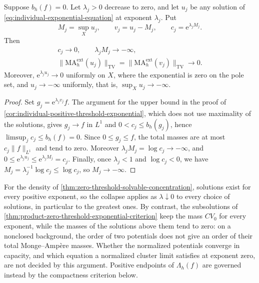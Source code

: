 \begin{proposition}\label{prop:zero-threshold-exponential-mass-collapse}
Suppose $b_h(f)=0$. Let $\lambda_j>0$ decrease to zero, and let $u_j$ be any solution of \eqref{eq:individual-exponential-equation} at exponent $\lambda_j$. Put
\[
 M_j=\sup_Xu_j,\qquad v_j=u_j-M_j,\qquad
 c_j=\mathrm e^{\lambda_jM_j}.
\]
Then
\begin{gather*}
 c_j\longrightarrow0,\qquad \lambda_jM_j\longrightarrow-\infty,\\
 \|\mathrm{MA}^{\mathrm{ext}}_h(u_j)\|_{\mathrm{TV}}
 =\|\mathrm{MA}^{\mathrm{ext}}_h(v_j)\|_{\mathrm{TV}}
 \longrightarrow0.
\end{gather*}
Moreover, $\mathrm e^{\lambda_ju_j}\to0$ uniformly on $X$, where the exponential is zero on the pole set, and $u_j\to-\infty$ uniformly, that is, $\sup_Xu_j\to-\infty$.
\end{proposition}
\begin{proof}
Set $g_j=\mathrm e^{\lambda_jv_j}f$. The argument for the upper bound in the proof of \cref{cor:individual-positive-threshold-exponential}, which does not use maximality of the solutions, gives $g_j\to f$ in $L^1$ and $0<c_j\leq b_h(g_j)$, hence $\limsup_jc_j\leq b_h(f)=0$. Since $0\leq g_j\leq f$, the total masses are at most $c_j\|f\|_{L^1}$ and tend to zero. Moreover $\lambda_jM_j=\log c_j\to-\infty$, and $0\leq\mathrm e^{\lambda_ju_j}\leq\mathrm e^{\lambda_jM_j}=c_j$. Finally, once $\lambda_j<1$ and $\log c_j<0$, we have $M_j=\lambda_j^{-1}\log c_j\leq\log c_j$, so $M_j\to-\infty$.
\end{proof}

For the density of \cref{thm:zero-threshold-solvable-concentration}, solutions exist for every positive exponent, so the collapse applies as $\lambda\downarrow0$ to every choice of solutions, in particular to the greatest ones. By contrast, the subsolutions of \cref{thm:product-zero-threshold-exponential-criterion} keep the mass $CV_0$ for every exponent, while the masses of the solutions above them tend to zero: on a nonclosed background, the order of two potentials does not give an order of their total Monge--Amp\`ere masses. Whether the normalized potentials converge in capacity, and which equation a normalized cluster limit satisfies at exponent zero, are not decided by this argument. Positive endpoints of $\Lambda_h(f)$ are governed instead by the compactness criterion below.

